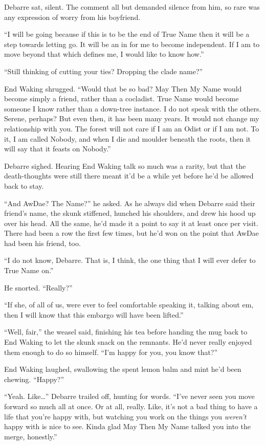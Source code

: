 Debarre sat, silent. The comment all but demanded silence from him, so rare was any expression of worry from his boyfriend.

``I will be going because if this is to be the end of True Name then it will be a step towards letting go. It will be an in for me to become independent. If I am to move beyond that which defines me, I would like to know how.''

``Still thinking of cutting your ties? Dropping the clade name?''

End Waking shrugged. ``Would that be so bad? May Then My Name would become simply a friend, rather than a cocladist. True Name would become someone I know rather than a down-tree instance. I do not speak with the others. Serene, perhaps? But even then, it has been many years. It would not change my relationship with you. The forest will not care if I am an Odist or if I am not. To it, I am called Nobody, and when I die and moulder beneath the roots, then it will say that it feasts on Nobody.''

Debarre sighed. Hearing End Waking talk so much was a rarity, but that the death-thoughts were still there meant it'd be a while yet before he'd be allowed back to stay.

``And AwDae? The Name?'' he asked. As he always did when Debarre said their friend's name, the skunk stiffened, hunched his shoulders, and drew his hood up over his head. All the same, he'd made it a point to say it at least once per visit. There had been a row the first few times, but he'd won on the point that AwDae had been his friend, too.

``I do not know, Debarre. That is, I think, the one thing that I will ever defer to True Name on.''

He snorted. ``Really?''

``If she, of all of us, were ever to feel comfortable speaking it, talking about em, then I will know that this embargo will have been lifted.''

``Well, fair,'' the weasel said, finishing his tea before handing the mug back to End Waking to let the skunk snack on the remnants. He'd never really enjoyed them enough to do so himself. ``I'm happy for you, you know that?''

End Waking laughed, swallowing the spent lemon balm and mint he'd been chewing. ``Happy?''

``Yeah. Like\ldots{}'' Debarre trailed off, hunting for words. ``I've never seen you move forward so much all at once. Or at all, really. Like, it's not a bad thing to have a life that you're happy with, but watching you work on the things you \emph{weren't} happy with is nice to see. Kinda glad May Then My Name talked you into the merge, honestly.''

